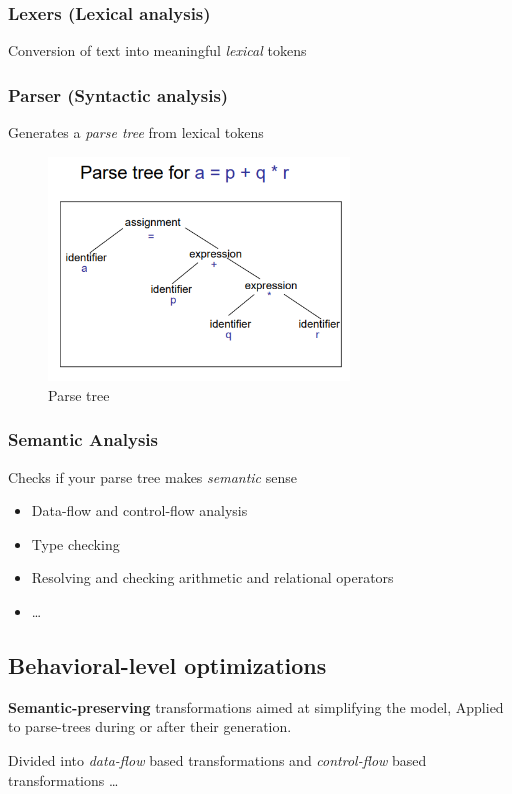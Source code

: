 \documentclass{article}
\begin{document}
\subsubsection{Lexers (Lexical analysis)}
Conversion of text into meaningful \textit{lexical} tokens

\subsubsection{Parser (Syntactic analysis)}
Generates a \textit{parse tree} from lexical tokens
\begin{figure}[htp]
    \centering
    \includegraphics[width=8cm, scale=1]{S2/parseTree.PNG}
    \caption{Parse tree}
\end{figure}

\subsubsection{Semantic Analysis}
Checks if your parse tree makes \textit{semantic} sense

\begin{itemize}
    \item Data-flow and control-flow analysis
    \item Type checking
    \item Resolving and checking arithmetic and relational operators
    \item \dots
\end{itemize}

\subsection{Behavioral-level optimizations}
\textbf{Semantic-preserving} transformations aimed at simplifying the model,
Applied to parse-trees during or after their generation.

Divided into \textit{data-flow} based transformations and \textit{control-flow} based transformations \dots
\end{document}
